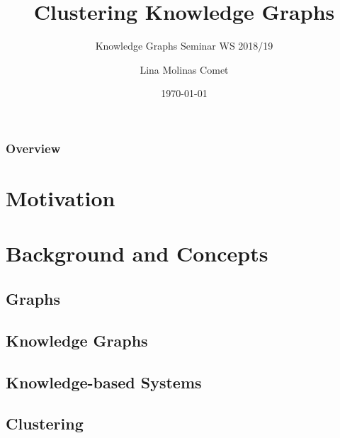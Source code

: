 \documentclass{beamer}
\title[\center{Knowledge Graphs Seminar \mbox{WS 2018/19}}]{Clustering Knowledge Graphs} %
\subtitle{Knowledge Graphs Seminar WS 2018/19}
\author{Lina Molinas Comet} %
\institute[RWTH Aachen] %
{
RWTH Aachen University, Germany \\ %
\medskip
\textit{lina.molinas.comet@rwth-aachen.de} %
}
\date{\today} %
\begin{document}
\begin{frame}
\titlepage %
\end{frame}

\begin{frame}
\frametitle{Overview} %
\tableofcontents %
\end{frame}


\section{Motivation} %

\section{Background and Concepts} %
\subsection{Graphs}
\subsection{Knowledge Graphs}
\subsection{Knowledge-based Systems}
\subsection{Clustering}
\end{document}
